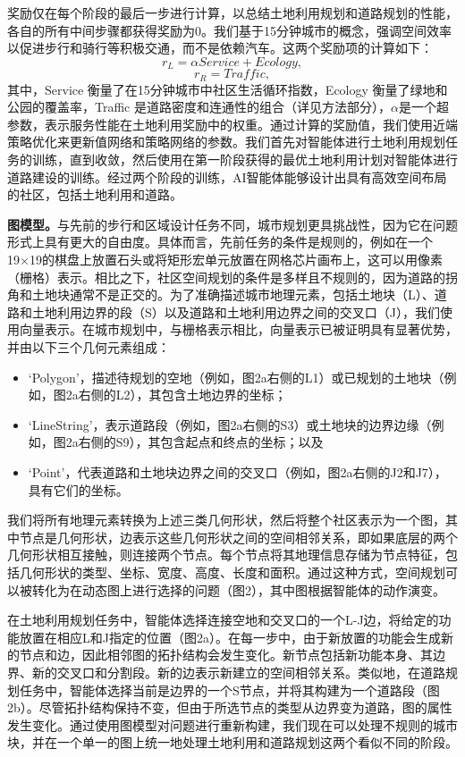 奖励仅在每个阶段的最后一步进行计算，以总结土地利用规划和道路规划的性能，各自的所有中间步骤都获得奖励为0。我们基于15分钟城市的概念，强调空间效率以促进步行和骑行等积极交通，而不是依赖汽车。这两个奖励项的计算如下：
\begin{equation}
    r_L = \alpha Service +Ecology,
\end{equation}
\begin{equation}
    r_R = Traffic,
\end{equation}
其中，Service 衡量了在15分钟城市中社区生活循环指数，Ecology 衡量了绿地和公园的覆盖率，Traffic 是道路密度和连通性的组合（详见方法部分），$\alpha$是一个超参数，表示服务性能在土地利用奖励中的权重。通过计算的奖励值，我们使用近端策略优化来更新值网络和策略网络的参数。我们首先对智能体进行土地利用规划任务的训练，直到收敛，然后使用在第一阶段获得的最优土地利用计划对智能体进行道路建设的训练。经过两个阶段的训练，AI智能体能够设计出具有高效空间布局的社区，包括土地利用和道路。

\textbf{图模型。}与先前的步行和区域设计任务不同，城市规划更具挑战性，因为它在问题形式上具有更大的自由度。具体而言，先前任务的条件是规则的，例如在一个19×19的棋盘上放置石头或将矩形宏单元放置在网格芯片画布上，这可以用像素（栅格）表示。相比之下，社区空间规划的条件是多样且不规则的，因为道路的拐角和土地块通常不是正交的。为了准确描述城市地理元素，包括土地块（L）、道路和土地利用边界的段（S）以及道路和土地利用边界之间的交叉口（J），我们使用向量表示。在城市规划中，与栅格表示相比，向量表示已被证明具有显著优势，并由以下三个几何元素组成：
\begin{itemize}
    \item ‘Polygon’，描述待规划的空地（例如，图2a右侧的L1）或已规划的土地块（例如，图2a右侧的L2），其包含土地边界的坐标；
    \item ‘LineString’，表示道路段（例如，图2a右侧的S3）或土地块的边界边缘（例如，图2a右侧的S9），其包含起点和终点的坐标；以及
    \item ‘Point’，代表道路和土地块边界之间的交叉口（例如，图2a右侧的J2和J7），具有它们的坐标。
\end{itemize}

我们将所有地理元素转换为上述三类几何形状，然后将整个社区表示为一个图，其中节点是几何形状，边表示这些几何形状之间的空间相邻关系，即如果底层的两个几何形状相互接触，则连接两个节点。每个节点将其地理信息存储为节点特征，包括几何形状的类型、坐标、宽度、高度、长度和面积。通过这种方式，空间规划可以被转化为在动态图上进行选择的问题（图2），其中图根据智能体的动作演变。

在土地利用规划任务中，智能体选择连接空地和交叉口的一个L-J边，将给定的功能放置在相应L和J指定的位置（图2a）。在每一步中，由于新放置的功能会生成新的节点和边，因此相邻图的拓扑结构会发生变化。新节点包括新功能本身、其边界、新的交叉口和分割段。新的边表示新建立的空间相邻关系。类似地，在道路规划任务中，智能体选择当前是边界的一个S节点，并将其构建为一个道路段（图2b）。尽管拓扑结构保持不变，但由于所选节点的类型从边界变为道路，图的属性发生变化。通过使用图模型对问题进行重新构建，我们现在可以处理不规则的城市块，并在一个单一的图上统一地处理土地利用和道路规划这两个看似不同的阶段。

